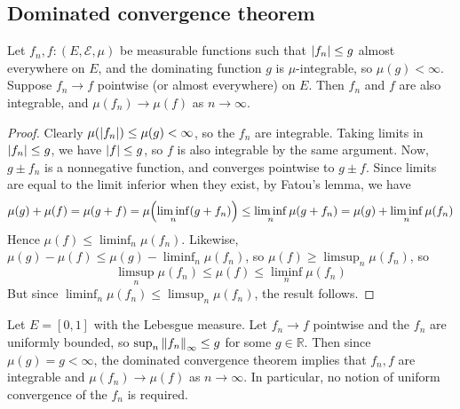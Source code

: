 \subsection{Dominated convergence theorem}
\begin{theorem}
	Let \( f_n, f \colon (E, \mathcal E, \mu) \) be measurable functions such that \( \abs{f_n} \leq g \) almost everywhere on \( E \), and the dominating function \( g \) is \( \mu \)-integrable, so \( \mu(g) < \infty \).
	Suppose \( f_n \to f \) pointwise (or almost everywhere) on \( E \).
	Then \( f_n \) and \( f \) are also integrable, and \( \mu(f_n) \to \mu(f) \) as \( n \to \infty \).
\end{theorem}
\begin{proof}
	Clearly \( \mu(\abs{f_n}) \leq \mu(g) < \infty \), so the \( f_n \) are integrable.
	Taking limits in \( \abs{f_n} \leq g \), we have \( \abs{f} \leq g \), so \( f \) is also integrable by the same argument.
	Now, \( g \pm f_n \) is a nonnegative function, and converges pointwise to \( g \pm f \).
	Since limits are equal to the limit inferior when they exist, by Fatou's lemma, we have
	\[ \mu(g) + \mu(f) = \mu(g + f) = \mu\qty(\liminf_n (g + f_n)) \leq \liminf_n \mu(g + f_n) = \mu(g) + \liminf_n \mu(f_n) \]
	Hence \( \mu(f) \leq \liminf_n \mu(f_n) \).
	Likewise, \( \mu(g) - \mu(f) \leq \mu(g) - \liminf_n \mu(f_n) \), so \( \mu(f) \geq \limsup_n \mu(f_n) \), so
	\[ \limsup_n \mu(f_n) \leq \mu(f) \leq \liminf_n \mu(f_n) \]
	But since \( \liminf_n \mu(f_n) \leq \limsup_n \mu(f_n) \), the result follows.
\end{proof}
\begin{example}
	Let \( E = [0,1] \) with the Lebesgue measure.
	Let \( f_n \to f \) pointwise and the \( f_n \) are uniformly bounded, so \( \sup_n \norm{f_n}_\infty \leq g \) for some \( g \in \mathbb R \).
	Then since \( \mu(g) = g < \infty \), the dominated convergence theorem implies that \( f_n, f \) are integrable and \( \mu(f_n) \to \mu(f) \) as \( n \to \infty \).
	In particular, no notion of uniform convergence of the \( f_n \) is required.
\end{example}
